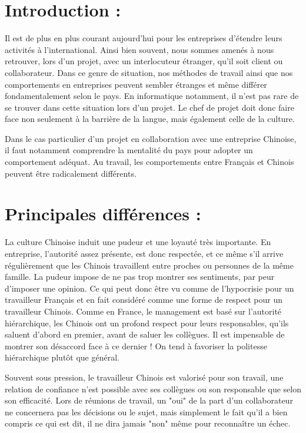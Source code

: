\documentclass{article}
\begin{document}
\section{Introduction :}
Il est de plus en plus courant aujourd'hui pour les entreprises d'étendre leurs activités à l'international. Ainsi bien souvent, nous sommes amenés à nous retrouver, lors d'un projet, avec un interlocuteur étranger, qu'il soit client ou collaborateur.
Dans ce genre de situation, nos méthodes de travail ainsi que nos comportements en entreprises peuvent sembler étranges et même différer fondamentalement selon le pays.
En informatique notamment, il n'est pas rare de se trouver dans cette situation lors d'un projet. Le chef de projet doit donc faire face non seulement à la barrière de la langue, mais également celle de la culture.

Dans le cas particulier d'un projet en collaboration avec une entreprise Chinoise, il faut notamment comprendre la mentalité du pays pour adopter un comportement adéquat. Au travail, les comportements entre Français et Chinois peuvent être radicalement différents. \\


\section{Principales différences :}
La culture Chinoise induit une pudeur et une loyauté très importante. En entreprise, l'autorité assez présente, est donc respectée, et ce même s'il arrive régulièrement que les Chinois travaillent entre proches ou personnes de la même famille. La pudeur impose de ne pas trop montrer ses sentiments, par peur d'imposer une opinion. Ce qui peut donc être vu comme de l'hypocrisie pour un travailleur Français et en fait considéré comme une forme de respect pour un travailleur Chinois.
Comme en France, le management est basé sur l'autorité hiérarchique, les Chinois ont un profond respect pour leurs responsables, qu'ils saluent d'abord en premier, avant de saluer les collègues. Il est impensable de montrer son désaccord face à ce dernier ! On tend à favoriser la politesse hiérarchique plutôt que général.

Souvent sous pression, le travailleur Chinois est valorisé pour son travail, une relation de confiance n'est possible avec ses collègues ou son responsable que selon son efficacité. Lors de réunions de travail, un "oui" de la part d'un collaborateur ne concernera pas les décisions ou le sujet, mais simplement le fait qu'il a bien compris ce qui est dit, il ne dira jamais "non" même pour reconnaître un échec.
\end{document}

